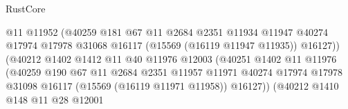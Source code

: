 \begin{lexlean}{RustCore}
\begin{coremodule}
                                            @11
                                            @11952
                                            (@40259
                                              @181
                                              @67
                                              @11
                                              @2684
                                              @2351
                                              @11934
                                              @11947
                                              @40274
                                              @17974
                                              @17978
                                              @31068
                                              @16117
                                              (@15569 (@16119 @11947 @11935))
                                              @16127))
                                          (@40212
                                            @1402
                                            @1412
                                            @11
                                            @40
                                            @11976
                                            @12003
                                            (@40251
                                              @1402
                                              @11
                                              @11976
                                              (@40259
                                                @190
                                                @67
                                                @11
                                                @2684
                                                @2351
                                                @11957
                                                @11971
                                                @40274
                                                @17974
                                                @17978
                                                @31098
                                                @16117
                                                (@15569 (@16119 @11971 @11958))
                                                @16127))
                                            (@40212
                                              @1410
                                              @148
                                              @11
                                              @28
                                              @12001

\end{coremodule}
\end{lexlean}
